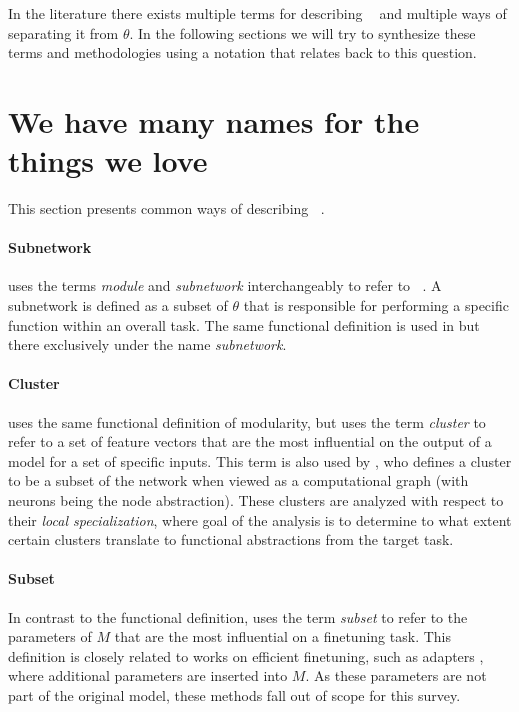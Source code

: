 \documentclass[11pt]{article}
\DeclareMathOperator*{\subnetwork}{\hat{\theta}}
\begin{document}
In the literature there exists  multiple terms for describing $\subnetwork$ and multiple ways of separating it from $\theta$. In the following sections we will try to synthesize these terms and methodologies using a notation that relates back to this question.

\section{We have many names for the things we love}
This section presents common ways of describing $\subnetwork$.
\paragraph{Subnetwork}
\citet{csordas2020neural} uses the terms \textit{module} and \textit{subnetwork} interchangeably to refer to $\subnetwork$. A subnetwork is defined as a subset of $\theta$ that is responsible for performing a specific function within an overall task. The same functional definition is used in \citet{lepori2023break} but there exclusively under the name \textit{subnetwork}. 
\paragraph{Cluster}
\citet{watanabe2019interpreting} uses the same functional definition of modularity, but uses the term \textit{cluster} to refer to a set of feature vectors that are the most influential on the output of a model for a set of specific inputs. This term is also used by \citet{casper2022graphical}, who defines a cluster to be a subset of the network when viewed as a computational graph (with neurons being the node abstraction). These clusters are analyzed with respect to their \textit{local specialization}, where goal of the analysis is to determine to what extent certain clusters translate to functional abstractions from the target task.
\paragraph{Subset}
In contrast to the functional definition, \citet{ansell-etal-2022-composable} uses the term \textit{subset} to refer to the parameters of $M$ that are the most influential on a finetuning task. This definition is closely related to works on efficient finetuning, such as adapters \citep{houlsby2019parameter}, where additional parameters are inserted into $M$. As these parameters are not part of the original model, these methods fall out of scope for this survey.
\end{document}
